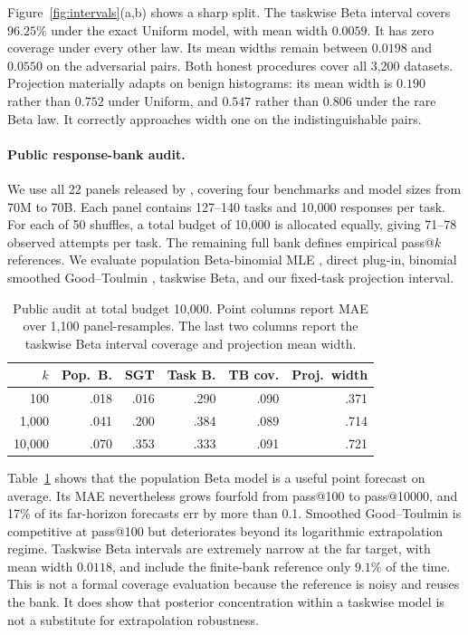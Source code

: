 \documentclass[twoside]{article}
\begin{document}
Figure~\ref{fig:intervals}(a,b) shows a sharp split. The taskwise Beta interval covers \(96.25\%\) under the exact Uniform model, with mean width \(0.0059\). It has zero coverage under every other law. Its mean widths remain between \(0.0198\) and \(0.0550\) on the adversarial pairs. Both honest procedures cover all 3,200 datasets. Projection materially adapts on benign histograms: its mean width is \(0.190\) rather than \(0.752\) under Uniform, and \(0.547\) rather than \(0.806\) under the rare Beta law. It correctly approaches width one on the indistinguishable pairs.

\paragraph{Public response-bank audit.}
We use all 22 panels released by \citet{brown2024}, covering four benchmarks and model sizes from 70M to 70B. Each panel contains 127--140 tasks and 10,000 responses per task. For each of 50 shuffles, a total budget of 10,000 is allocated equally, giving 71--78 observed attempts per task. The remaining full bank defines empirical pass@\(k\) references. We evaluate population Beta-binomial MLE \citep{kazdan2025}, direct plug-in, binomial smoothed Good--Toulmin \citep{orlitsky2016}, taskwise Beta, and our fixed-task projection interval.

\begin{table}[t]
\caption{Public audit at total budget 10,000. Point columns report MAE over
1,100 panel-resamples. The last two columns report the taskwise Beta interval coverage and projection mean width.}
\label{tab:public}
\centering
\small \setlength{\tabcolsep}{3.0pt}
\begin{tabular}{rrrrrr}
\toprule
\(k\) & Pop.\ B. & SGT & Task B. & TB cov. & Proj.\ width\\
\midrule
100    & .018 & .016 & .290 & .090 & .371\\
1,000  & .041 & .200 & .384 & .089 & .714\\
10,000 & .070 & .353 & .333 & .091 & .721\\
\bottomrule
\end{tabular}
\end{table}

Table~\ref{tab:public} shows that the population Beta model is a useful point forecast on average. Its MAE nevertheless grows fourfold from pass@100 to pass@10000, and 17\% of its far-horizon forecasts err by more than 0.1. Smoothed Good--Toulmin is competitive at pass@100 but deteriorates beyond its logarithmic extrapolation regime. Taskwise Beta intervals are extremely narrow at the far target, with mean width \(0.0118\), and include the finite-bank reference only \(9.1\%\) of the time. This is not a formal coverage evaluation because the reference is noisy and reuses the bank. It does show that posterior concentration within a taskwise model is not a substitute for extrapolation robustness.
\end{document}
